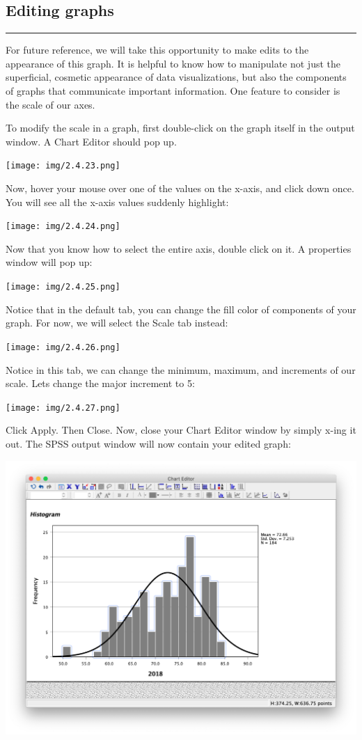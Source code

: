 \documentclass[]{book}
\begin{document}
\subsection{Editing graphs}\label{editing-graphs}

\begin{center}\rule{0.5\linewidth}{0.5pt}\end{center}

For future reference, we will take this opportunity to make edits to the
appearance of this graph. It is helpful to know how to manipulate not
just the superficial, cosmetic appearance of data visualizations, but
also the components of graphs that communicate important information.
One feature to consider is the scale of our axes.

To modify the scale in a graph, first {double-click} on the graph itself
in the output window. A Chart Editor should pop up.

\texttt{[image: img/2.4.23.png]}

Now, hover your mouse over one of the values on the x-axis, and click
down once. You will see all the x-axis values suddenly highlight:

\texttt{[image: img/2.4.24.png]}

Now that you know how to select the entire axis, {double click} on it. A
properties window will pop up:

\texttt{[image: img/2.4.25.png]}

Notice that in the default tab, you can change the fill color of
components of your graph. For now, we will select the {Scale} tab
instead:

\texttt{[image: img/2.4.26.png]}

Notice in this tab, we can change the minimum, maximum, and increments
of our scale. Lets change the major increment to 5:

\texttt{[image: img/2.4.27.png]}

Click {Apply}. Then {Close}. Now, close your Chart Editor window by
simply {x}-ing it out. The SPSS output window will now contain your
edited graph:

\includegraphics{img/2.4.28.png}
\end{document}
